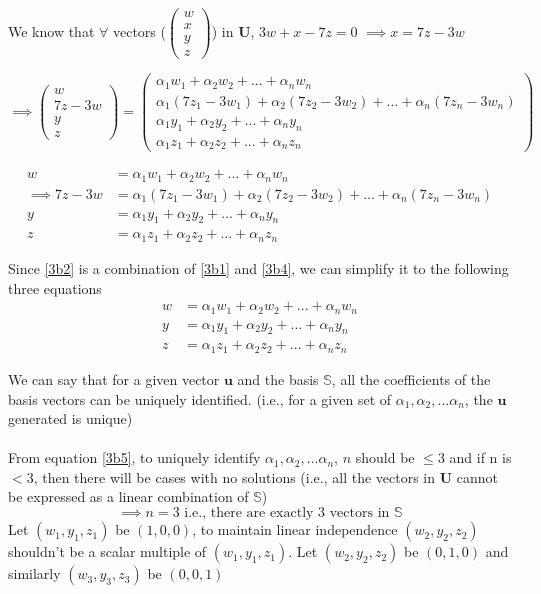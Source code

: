 \documentclass[12pt, letterpaper]{article}
\begin{document}
We know that $\forall$ vectors ($\begin{pmatrix} w\\x\\y\\z \end{pmatrix}$) in $\mathbf{U}$, $3w + x -7z = 0$
$\implies x = 7z - 3w$

\[
\implies \begin{pmatrix} w\\7z - 3w\\y\\z \end{pmatrix}
= \begin{pmatrix}
  \alpha_1 w_1 + \alpha_2 w_2 + ... + \alpha_n w_n\\
  \alpha_1 (7z_1 - 3w_1) + \alpha_2 (7z_2 - 3w_2) + ... + \alpha_n (7z_n - 3w_n)\\
  \alpha_1 y_1 + \alpha_2 y_2 + ... + \alpha_n y_n\\
  \alpha_1 z_1 + \alpha_2 z_2 + ... + \alpha_n z_n
\end{pmatrix}
\]

\begin{align}
w &= \alpha_1 w_1 + \alpha_2 w_2 + ... + \alpha_n w_n\label{3b1}\\
\implies 7z - 3w &= \alpha_1 (7z_1 - 3w_1) + \alpha_2 (7z_2 - 3w_2) + ... + \alpha_n (7z_n - 3w_n)\label{3b2}\\
y &= \alpha_1 y_1 + \alpha_2 y_2 + ... + \alpha_n y_n\label{3b3}\\
z &= \alpha_1 z_1 + \alpha_2 z_2 + ... + \alpha_n z_n\label{3b4}
\end{align}

Since \ref{3b2} is a combination of \ref{3b1} and \ref{3b4}, we can simplify it to
the following three equations
\begin{equation}
  \label{3b5}
  \begin{split}
  w &= \alpha_1 w_1 + \alpha_2 w_2 + ... + \alpha_n w_n\\
  y &= \alpha_1 y_1 + \alpha_2 y_2 + ... + \alpha_n y_n\\
  z &= \alpha_1 z_1 + \alpha_2 z_2 + ... + \alpha_n z_n
  \end{split}
\end{equation}

We can say that for a given vector $\mathbf{u}$ and the basis $\mathbb{S}$,
all the coefficients of the basis vectors can be uniquely identified. (i.e., for a given set of $\alpha_1,\alpha_2,...\alpha_n$, the $\mathbf{u}$ generated is unique)\\\\
From equation \ref{3b5}, to uniquely identify $\alpha_1,\alpha_2,...\alpha_n$, $n$ should be $\le 3$ and if n is $< 3$, then there will be cases with no solutions (i.e., all the vectors in $\mathbf{U}$ cannot be expressed as a linear combination of $\mathbb{S}$)
\[ \implies n = 3\text{ i.e., there are exactly 3 vectors in } \mathbb{S} \]
Let $(w_1,y_1,z_1)$ be $(1,0,0)$, to maintain linear independence $(w_2,y_2,z_2)$ shouldn't be a scalar multiple of $(w_1,y_1,z_1)$. Let $(w_2,y_2,z_2)$ be $(0,1,0)$ and similarly $(w_3,y_3,z_3)$ be $(0,0,1)$
\end{document}
